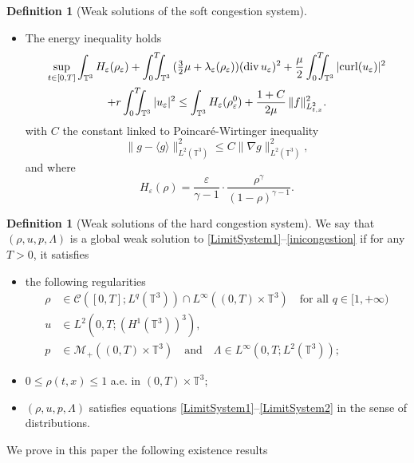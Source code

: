 \documentclass[10pt]{amsart}
\let\mathcal\mathscr
\newcommand{\<}{\bigl\langle}
\renewcommand{\>}{\bigr\rangle}
\newcommand{\intTTT}{\int_0^T\hspace*{-2.5mm}\int_{\TT}}
\newcommand{\labeleq}[1]{}
\theoremstyle{definition}
\newtheorem{definition}[thm]{Definition}
\theoremstyle{remark}
\newcommand{\TT}{\mathbb{T}^3}
\DeclareMathOperator{\curl}{curl}
\DeclareMathOperator{\Div}{div}
\let\ep\varepsilon
\begin{document}
\begin{definition}[Weak solutions of the soft congestion system]
\begin{itemize}
\item The energy inequality holds
\begin{multline*}\labeleq{energy_ep-0}
\sup_{t\in[0,T]} \int_{\TT} H_{\ep}(\rho_{\ep})
+ \intTTT{(\tfrac{3}{2}\mu+\lambda_{\ep}(\rho_{\ep}))(\Div u_{\ep})^2 } + \frac{\mu}{2} \intTTT{ |{\curl (u_{\ep})}|^2}\\
+ r \intTTT{ |u_{\ep}|^2}
\leq \int_{\TT}{H_{\ep}(\rho_\ep^0)} + \frac{1+C}{2\mu}\, \|f\|^2_{L^2_{t,x}}.
\end{multline*}
with $C$ the constant linked to Poincaré-Wirtinger inequality
$$\|g - \<g\>\|^2_{L^2(\TT)} \le C \|\nabla g \|^2_{L^2(\TT)}, $$
and where
\begin{equation*}\labeleq{H_ep}
H_{\ep}(\rho) = \dfrac{\ep}{\gamma-1}\cdot \dfrac{\rho^{\gamma}}{(1-\rho)^{\gamma-1}}.
\end{equation*} 
\end{itemize}
\end{definition}

\begin{definition}[Weak solutions of the hard congestion system]
We say that $(\rho,u,p,\Lambda)$ is a global weak solution to \eqref{LimitSystem1}--\eqref{inicongestion} if for any $T > 0$, it satisfies
\begin{itemize}
\item the following regularities
\begin{align*}
\rho &\in \mathcal{C}([0,T];L^q(\TT)) \cap L^\infty((0,T) \times \TT)\quad \text{for all } q \in [1, +\infty)\\
u &\in L^2(0,T;(H^1(\TT))^3),\\
p &\in \mathcal{M}_+((0,T)\times \TT) \quad \text{and} \quad \Lambda \in L^\infty(0,T;L^2(\TT));
\end{align*}
\item $0 \leq \rho(t,x) \leq 1$ a.e. in $(0,T)\times \TT$;
\item $(\rho,u,p,\Lambda)$ satisfies equations \eqref{LimitSystem1}--\eqref{LimitSystem2} in the sense of distributions.
\end{itemize}
\end{definition}

We prove in this paper the following existence results
\end{document}
